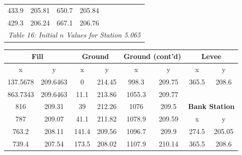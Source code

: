 \begin{center}
\begin{tabular}{|cccc||cccc||cc|}
    433.9    & 205.81                   & 650.7 & 205.84                        &       &                                     &        &                                       &          &                                     \\
    429.3    & 206.24                   & 667.1 & 206.76                        &       &                                     &        &                                       &          &                                     \\
    \hline\multicolumn{10}{c}{\emph{Table 16: Initial $n$ Values for Station 5.065}}
\end{tabular}


\begin{tabular}{|cccc||cc||cc|} 
    \hline
    \multicolumn{2}{|c}{\textbf{Fill }} & \multicolumn{2}{c||}{\textbf{Ground }} & \multicolumn{2}{c||}{\textbf{Ground (cont'd) }} & \multicolumn{2}{c|}{\textbf{Levee }}           \\ 
    \hline
    x        & y                        & x     & y                             & x      & y                                     & x        & y                                   \\
    137.5678 & 209.6463                 & 0     & 214.45                        & 998.3  & 209.75                                & 365.5    & 208.6                               \\
    863.7343 & 209.6463                 & 11.1  & 213.86                        & 1055.3 & 209.77                                &          &                                     \\
    816      & 209.31                   & 39    & 212.26                        & 1076   & 209.5                                 & \multicolumn{2}{c|}{\textbf{Bank Station }}    \\ 
    \cline{7-8}
    787      & 209.07                   & 41.1  & 211.82                        & 1078.9 & 209.59                                & x        & y                                   \\
    763.2    & 208.11                   & 141.4 & 209.56                        & 1096.7 & 209.9                                 & 274.5    & 205.05                              \\
    739.4    & 207.54                   & 173.5 & 208.02                        & 1107.9 & 210.14                                & 365.5    & 208.6                               \\

\end{tabular}
\end{center}
